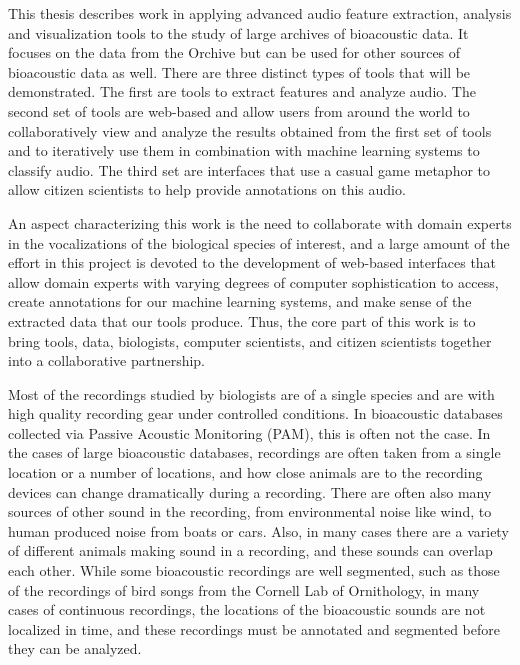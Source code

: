\documentclass[12pt,oneside]{book}
\begin{document}
This thesis describes work in applying advanced audio feature
extraction, analysis and visualization tools to the study of large
archives of bioacoustic data.  It focuses on the data from the Orchive
but can be used for other sources of bioacoustic data as well.  There
are three distinct types of tools that will be demonstrated.  The
first are tools to extract features and analyze audio.  The second set
of tools are web-based and allow users from around the world to
collaboratively view and analyze the results obtained from the first
set of tools and to iteratively use them in combination with machine
learning systems to classify audio.  The third set are interfaces that
use a casual game metaphor to allow citizen scientists to help provide
annotations on this audio.

An aspect characterizing this work is the need to collaborate with
domain experts in the vocalizations of the biological species of
interest, and a large amount of the effort in this project is devoted
to the development of web-based interfaces that allow domain experts
with varying degrees of computer sophistication to access, create
annotations for our machine learning systems, and make sense of the
extracted data that our tools produce.  Thus, the core part of this
work is to bring tools, data, biologists, computer scientists, and
citizen scientists together into a collaborative partnership.

Most of the recordings studied by biologists are of a single species
and are with high quality recording gear under controlled conditions.
In bioacoustic databases collected via Passive Acoustic Monitoring
(PAM), this is often not the case.  In the cases of large bioacoustic
databases, recordings are often taken from a single location or a
number of locations, and how close animals are to the recording
devices can change dramatically during a recording.  There are often
also many sources of other sound in the recording, from environmental
noise like wind, to human produced noise from boats or
cars. Also, in many cases there are a variety of different animals
making sound in a recording, and these sounds can overlap each other.
While some bioacoustic recordings are well segmented, such as those of
the recordings of bird songs from the Cornell Lab of Ornithology, in
many cases of continuous recordings, the locations of the bioacoustic
sounds are not localized in time, and these recordings must be
annotated and segmented before they can be analyzed.
\end{document}
